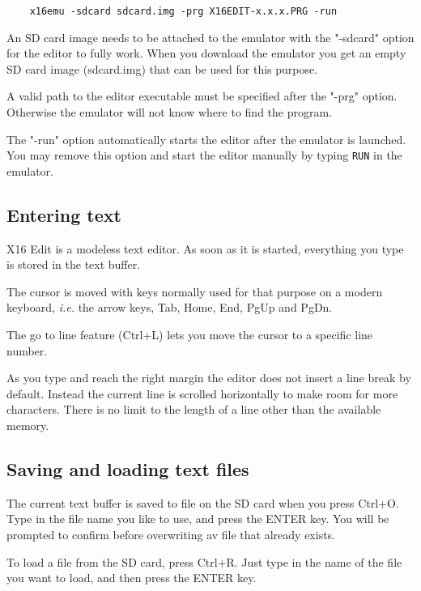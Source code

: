 \documentclass{article}
\begin{document}
\begin{verbatim}
    x16emu -sdcard sdcard.img -prg X16EDIT-x.x.x.PRG -run
\end{verbatim}
        An SD card image needs to be attached to the
        emulator with the "-sdcard" option for the editor to
        fully work. When you download the emulator you get an empty SD card
        image (sdcard.img) that can be used for this purpose.
 
        A valid path to the editor executable must be specified after
        the "-prg" option. Otherwise the emulator will not know where
        to find the program.
 
        The "-run" option automatically starts the editor after the emulator
        is launched. You may remove this option and start the editor manually
        by typing \texttt{RUN} in the emulator.
 
    \subsection{Entering text}
        X16 Edit is a modeless text editor. As soon as it is started, everything
        you type is stored in the text buffer.
 
        The cursor is moved with keys normally used for that purpose on a modern
        keyboard, \textit{i.e.} the arrow keys, Tab, Home, End, PgUp and PgDn.

        The go to line feature (Ctrl+L) lets you move the cursor to a specific line number.
 
        As you type and reach the right margin the editor does not insert a line break
        by default. Instead the current line is scrolled horizontally to
        make room for more characters. There is no limit to the length of a line
        other than the available memory.
 
    \subsection{Saving and loading text files}
        The current text buffer is saved to file on the SD card when you press Ctrl+O. Type in the 
        file name you like to use, and press the ENTER key. You will
        be prompted to confirm before overwriting av file that already exists.
         
        To load a file from the SD card, press Ctrl+R. 
        Just type in the name of the file you want to load, and then press the ENTER key.
        
\end{document}
